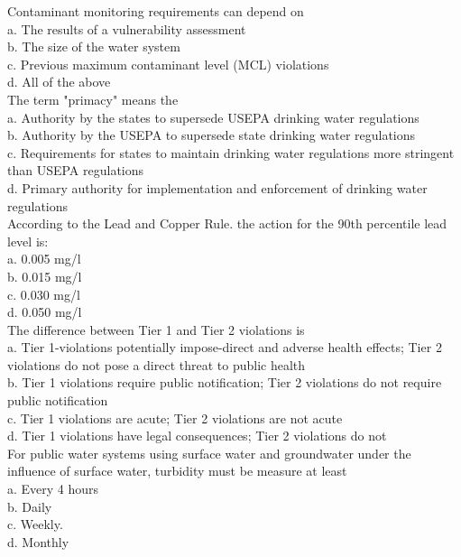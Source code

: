 Contaminant monitoring requirements can depend on\\
a. The results of a vulnerability assessment\\
b. The size of the water system\\
c. Previous maximum contaminant level (MCL) violations\\
d. All of the above\\

The term "primacy" means the\\
a. Authority by the states to supersede USEPA drinking water regulations\\
b. Authority by the USEPA to supersede state drinking water regulations\\
c. Requirements for states to maintain drinking water regulations more stringent than USEPA regulations \\
d. Primary authority for implementation and enforcement of drinking water regulations\\

According to the Lead and Copper Rule. the action for the 90th percentile lead level is:\\
a. 0.005 mg/l\\
b. 0.015 mg/l\\
c. 0.030 mg/l\\
d. 0.050 mg/l\\



The difference between Tier 1 and Tier 2 violations is\\
a.	Tier 1-violations potentially impose-direct and adverse health effects; Tier 2 violations do not pose a direct threat to public health\\
b. Tier 1 violations require public notification; Tier 2 violations do not require public notification\\
c. Tier 1 violations are acute; Tier 2 violations are not acute\\
d. Tier 1 violations have legal consequences; Tier 2 violations do not\\


For public water systems using surface water and groundwater under the influence of surface water, turbidity must be measure at least\\
a. Every 4 hours\\
b. Daily\\
c. Weekly.\\
d. Monthly\\

